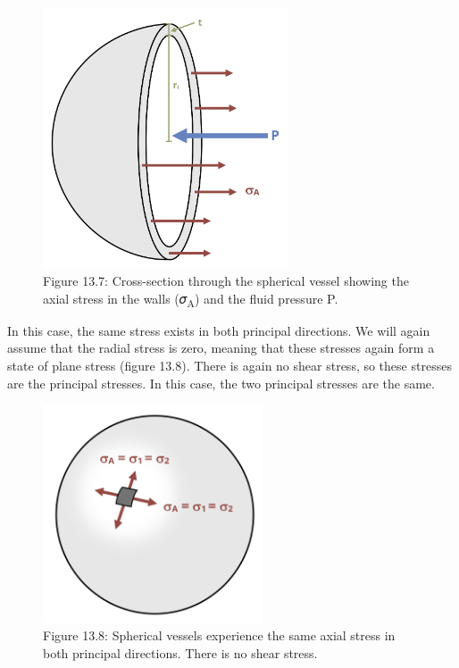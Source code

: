 \documentclass[
  letterpaper,
  DIV=11,
  numbers=noendperiod]{scrreprt}
\begin{document}
\begin{figure}[H]

{\centering \includegraphics[width=2.85417in,height=\textheight]{images/CH13 PNGs/figure 13.7.png}

}

\caption{Figure 13.7: Cross-section through the spherical vessel showing
the axial stress in the walls (𝜎\textsubscript{A}) and the fluid
pressure P.}

\end{figure}%

In this case, the same stress exists in both principal directions. We
will again assume that the radial stress is zero, meaning that these
stresses again form a state of plane stress (figure 13.8). There is
again no shear stress, so these stresses are the principal stresses. In
this case, the two principal stresses are the same.

\begin{figure}[H]

{\centering \includegraphics[width=2.5625in,height=\textheight]{images/CH13 PNGs/figure 13.8.png}

}

\caption{Figure 13.8: Spherical vessels experience the same axial stress
in both principal directions. There is no shear stress.}

\end{figure}%
\end{document}
